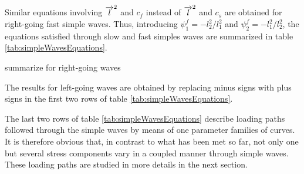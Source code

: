 Similar equations involving ${\overrightarrow{l}}^2$ and $c_f$ instead of ${\overrightarrow{l}}^2$ and $c_s$ are obtained for right-going fast simple waves. Thus, introducing $\psi^f_1=-l_2^2/l_1^2$ and $\psi^f_2=-l_1^2/l_2^2$, the equations satisfied through slow and fast simples waves are summarized in table \ref{tab:simpleWavesEquations}.
\begin{table}[h!]
  \centering
  
  \caption{summarize for right-going waves}
  \label{tab:simpleWavesEquations}
\end{table}
The results for left-going waves are obtained by replacing minus signs with plus signs in the first two rows of table \ref{tab:simpleWavesEquations}. 

The last two rows of table \ref{tab:simpleWavesEquations} describe loading paths followed through the simple waves by means of one parameter families of curves. It is therefore obvious that, in contrast to what has been met so far, not only one but several stress components vary in a coupled manner through simple waves. These loading paths are studied in more details in the next section.



